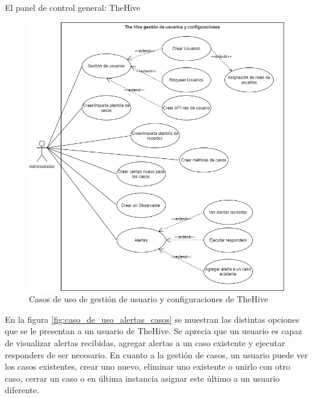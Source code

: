 \begin{section}{El panel de control general: TheHive }
     \begin{figure}[H]
        \centering
        \includegraphics[width=1\textwidth]{./descripcion_sonion_imagenes/figura_28_thehive_user_conf.png}
        \caption{Casos de uso de gestión de usuario y configuraciones de TheHive}
        \label{fig:caso_de_uso_gestion_usuario_conf_thehive}
     \end{figure}
     \FloatBarrier
     En la figura \ref{fig:caso_de_uso_alertas_casos} se muestran las distintas opciones que se le presentan a un usuario de TheHive. Se aprecia que un usuario es capaz de visualizar alertas recibidas, agregar alertas a un caso existente y ejecutar responders de ser necesario. En cuanto a la gestión de casos, un usuario puede ver los casos existentes, crear uno nuevo, eliminar uno existente o unirlo con otro caso, cerrar un caso o en última instancia asignar este último a un usuario diferente. 
     \begin{figure}[H]
        \centering

\end{figure}
\end{section}
